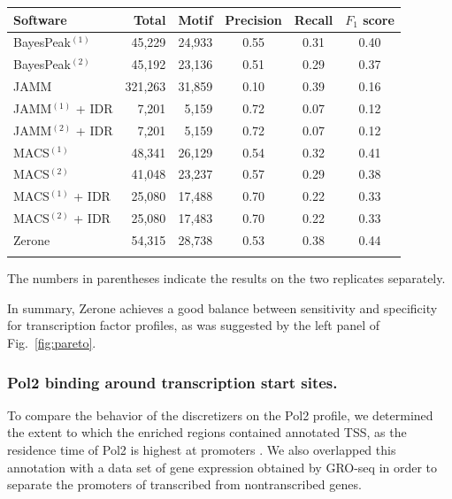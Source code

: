 \documentclass{bioinfo}
\begin{document}
\begin{table}[!b]
{\begin{tabular}{lrrccc}
        \toprule
        \textbf{Software}  & \textbf{Total}  & \textbf{Motif} &
        \textbf{Precision} & \textbf{Recall} & \textbf{$F_{1}$ score} \\
        \midrule
        BayesPeak$^{(1)}$  &  45,229 & 24,933 & 0.55 & 0.31 & 0.40 \\
        BayesPeak$^{(2)}$  &  45,192 & 23,136 & 0.51 & 0.29 & 0.37 \\
        JAMM               & 321,263 & 31,859 & 0.10 & 0.39 & 0.16 \\
        JAMM$^{(1)}$ + IDR &   7,201 &  5,159 & 0.72 & 0.07 & 0.12 \\
        JAMM$^{(2)}$ + IDR &   7,201 &  5,159 & 0.72 & 0.07 & 0.12 \\
        MACS$^{(1)}$       &  48,341 & 26,129 & 0.54 & 0.32 & 0.41 \\
        MACS$^{(2)}$       &  41,048 & 23,237 & 0.57 & 0.29 & 0.38 \\
        MACS$^{(1)}$ + IDR &  25,080 & 17,488 & 0.70 & 0.22 & 0.33 \\
        MACS$^{(2)}$ + IDR &  25,080 & 17,483 & 0.70 & 0.22 & 0.33 \\
        Zerone             &  54,315 & 28,738 & 0.53 & 0.38 & 0.44 \\
        \botrule
\end{tabular}}{The numbers in parentheses indicate the results on the two
replicates separately.}
\end{table}

In summary, Zerone achieves a good balance between sensitivity and
specificity for transcription factor profiles, as was suggested by
the left panel of Fig.~\ref{fig:pareto}.

\subsubsection{Pol2 binding around transcription start sites.}
\label{subsub:pol2}
To compare the behavior of the discretizers on the Pol2 profile,
we determined the extent to which the enriched regions contained
annotated TSS, as the residence time of Pol2 is highest at promoters
\citep{pmid19056941}.
We also overlapped this annotation with a data set of
gene expression obtained by GRO-seq in order to separate the
promoters of transcribed from nontranscribed genes.
\end{document}
